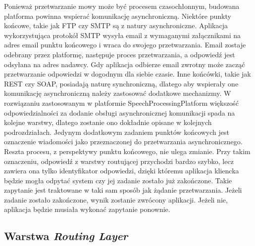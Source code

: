 Ponieważ przetwarzanie mowy może być procesem czasochłonnym, budowana platforma powinna wspierać komunikację asynchroniczną. Niektóre punkty końcowe, takie jak FTP czy SMTP są z natury asynchroniczne. Aplikacja wykorzystująca protokół SMTP wysyła email z wymaganymi załącznikami na adres email punktu końcowego i wraca do swojego przetwarzania. Email zostaje odebrany przez platformę, następuje proces przetwarzania, a odpowiedź jest odsyłana na adres nadawcy. Gdy aplikacja odbierze email zwrotny może zacząć przetwarzanie odpowiedzi w dogodnym dla siebie czasie. Inne końcówki, takie jak REST czy SOAP, posiadają naturę synchroniczną, dlatego aby wspierały one komunikację asynchroniczną należy zastosować dodatkowe mechanizmy. W rozwiązaniu zastosowanym w platformie SpeechProcessingPlatform większość odpowiedzialności za dodanie obsługi asynchronicznej komunikacji spada na kolejne warstwy, dlatego zostanie ono dokładnie opisane w kolejnych podrozdziałach. Jedynym dodatkowym zadaniem punktów końcowych jest oznaczenie wiadomości jako przeznaczonej do przetwarzania asynchronicznego. Reszta procesu, z perspektywy punktu końcowego, nie ulega zmianie. Przy takim oznaczeniu, odpowiedź z warstwy routującej przychodzi bardzo szybko, lecz zawiera ona tylko identyfikator odpowiedzi, dzięki któremu aplikacja kliencka będzie mogła odpytać system czy jej zadanie zostało już zakończone. Takie zapytanie jest traktowane w taki sam sposób jak żądanie przetwarzania. Jeżeli zadanie zostało zakończone, wynik zostanie zwrócony aplikacji. Jeżeli nie, aplikacja będzie musiała wykonać zapytanie ponownie.

\subsection{Warstwa \textit{Routing Layer}}

